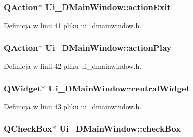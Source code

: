 \hypertarget{class_ui___d_main_window_ae1fa62a4d27fa0f4a5c63c7c60cfdad2}{
\subsubsection[{action\-Exit}]{\setlength{\rightskip}{0pt plus 5cm}Q\-Action$\ast$ Ui\-\_\-\-D\-Main\-Window\-::action\-Exit}}\label{class_ui___d_main_window_ae1fa62a4d27fa0f4a5c63c7c60cfdad2}


Definicja w linii 41 pliku ui\-\_\-dmainwindow.\-h.

\hypertarget{class_ui___d_main_window_a6cfb6311ca1dd6e247d80255e2667ba7}{
\subsubsection[{action\-Play}]{\setlength{\rightskip}{0pt plus 5cm}Q\-Action$\ast$ Ui\-\_\-\-D\-Main\-Window\-::action\-Play}}\label{class_ui___d_main_window_a6cfb6311ca1dd6e247d80255e2667ba7}


Definicja w linii 42 pliku ui\-\_\-dmainwindow.\-h.

\hypertarget{class_ui___d_main_window_a94cf40cb4e645cfa2e80f36ffbf5018e}{
\subsubsection[{central\-Widget}]{\setlength{\rightskip}{0pt plus 5cm}Q\-Widget$\ast$ Ui\-\_\-\-D\-Main\-Window\-::central\-Widget}}\label{class_ui___d_main_window_a94cf40cb4e645cfa2e80f36ffbf5018e}


Definicja w linii 43 pliku ui\-\_\-dmainwindow.\-h.

\hypertarget{class_ui___d_main_window_a41e765e074811602fbc5efecf07011ac}{
\subsubsection[{check\-Box}]{\setlength{\rightskip}{0pt plus 5cm}Q\-Check\-Box$\ast$ Ui\-\_\-\-D\-Main\-Window\-::check\-Box}}\label{class_ui___d_main_window_a41e765e074811602fbc5efecf07011ac}


